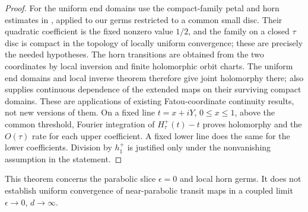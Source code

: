 \documentclass[11pt]{article}
\begin{document}
\begin{proof}
For the uniform end domains use the compact-family petal and horn
estimates in \cite[Propositions 29, 31 and 33]{Cheritat}, applied to
our germs restricted to a common small disc. Their quadratic
coefficient is the fixed nonzero value $1/2$, and the family on a
closed $\tau$ disc is compact in the topology of locally uniform
convergence; these are precisely the needed hypotheses.
The horn transitions are obtained from the two coordinates by local
inversion and finite holomorphic orbit charts. The uniform end
domains and local inverse theorem therefore give joint holomorphy
there; \cite[Proposition 34]{Cheritat} also supplies continuous
dependence of the extended maps on their surviving compact domains.
These are applications of existing Fatou-coordinate continuity
results, not new versions of them.
On a fixed line $t=x+iY$, $0\le x\le1$, above the common threshold,
Fourier integration of $H^+_\tau(t)-t$ proves holomorphy and the
$O(\tau)$ rate for each upper coefficient. A fixed lower line does
the same for the lower coefficients. Division by $h_1^+$ is justified
only under the nonvanishing assumption in the statement.
\end{proof}
This theorem concerns the parabolic slice $\epsilon=0$ and local horn
germs. It does not establish uniform convergence of near-parabolic
transit maps in a coupled limit $\epsilon\to0$, $d\to\infty$.
\end{document}
